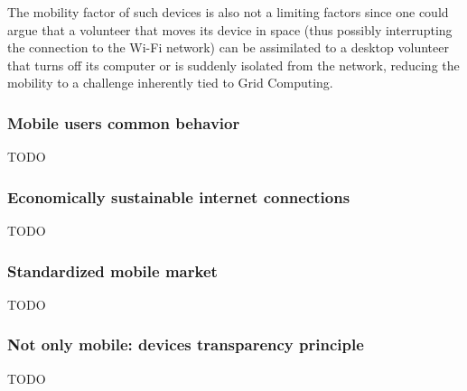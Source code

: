 The mobility factor of such devices is also not a limiting factors since one could argue that a volunteer that moves its device in space (thus possibly interrupting the connection to the Wi-Fi network) can be assimilated to a desktop volunteer that turns off its computer or is suddenly isolated from the network, reducing the mobility to a challenge inherently tied to Grid Computing.

\subsubsection{Mobile users common behavior}
TODO

\subsubsection{Economically sustainable internet connections}
TODO

\subsubsection{Standardized mobile market}
TODO

\subsubsection{Not only mobile: devices transparency principle}
TODO
